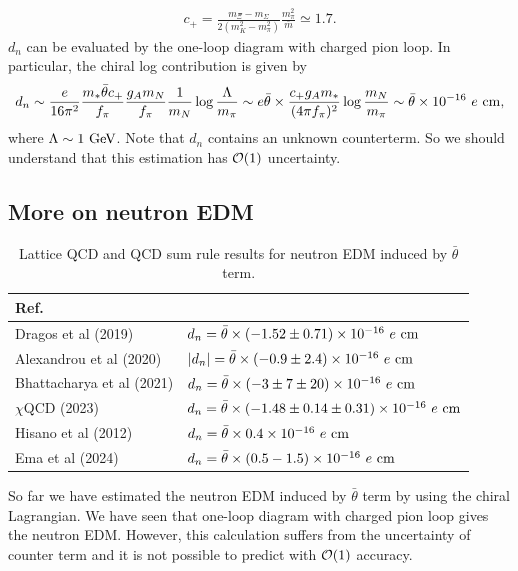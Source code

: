 \documentclass[11pt,a4paper]{article}
\begin{document}
\begin{align}
    c_+ = \frac{m_\Xi - m_\Sigma}{2(m_K^2 - m_\pi^2)} \frac{m_\pi^2}{\bar m} \simeq 1.7.
\end{align}
$d_n$ can be evaluated by the one-loop diagram with charged pion loop. In particular, the chiral log contribution is given by
\begin{align}
    d_n
    \sim \frac{e}{16\pi^2} \frac{m_* \bar\theta c_+}{f_\pi} \frac{g_A m_N}{f_\pi} \frac{1}{m_N} \log\frac{\Lambda}{m_\pi}
    \sim e\bar\theta \times \frac{c_+ g_A m_*}{(4\pi f_\pi)^2} \log\frac{m_N}{m_\pi}
    \sim \bar\theta \times 10^{-16} ~e~{\rm cm},
\end{align}
where $\Lambda \sim 1~{\rm GeV}$.
Note that $d_n$ contains an unknown counterterm. So we should understand that this estimation has ${\cal O}(1)$ uncertainty.


\subsection{More on neutron EDM}
\begin{table}[t]
\centering
\begin{tabular}{l|l}
    Ref. & \\
    \hline
    Dragos et al (2019) \cite{Dragos:2019oxn} & $d_n = \bar\theta \times (-1.52 \pm 0.71) \times 10^{-16}~e~{\rm cm}$ \\
    Alexandrou et al (2020) \cite{Alexandrou:2020mds} & $|d_n| = \bar\theta \times (-0.9 \pm 2.4) \times 10^{-16}~e~{\rm cm}$ \\
    Bhattacharya et al (2021) \cite{Bhattacharya:2021lol} & $d_n = \bar\theta \times (-3 \pm 7 \pm 20) \times 10^{-16}~e~{\rm cm}$ \\
    $\chi$QCD (2023) \cite{Liang:2023jfj} & $d_n = \bar\theta \times (-1.48 \pm 0.14 \pm 0.31) \times 10^{-16}~e~{\rm cm}$ \\\hline
    Hisano et al (2012) \cite{Hisano:2012sc} & $d_n = \bar\theta \times 0.4 \times 10^{-16}~e~{\rm cm}$\\
    Ema et al (2024) \cite{Ema:2024vfn} & $d_n = \bar\theta \times (0.5 - 1.5) \times 10^{-16}~e~{\rm cm}$
\end{tabular}
\caption{Lattice QCD and QCD sum rule results for neutron EDM induced by $\bar\theta$ term.}\label{tab:nedm lattice}
\end{table}
%
So far we have estimated the neutron EDM induced by $\bar\theta$ term by using the chiral Lagrangian. We have seen that one-loop diagram with charged pion loop gives the neutron EDM. However, this calculation suffers from the uncertainty of counter term and it is not possible to predict with ${\cal O}(1)$ accuracy.
\end{document}

